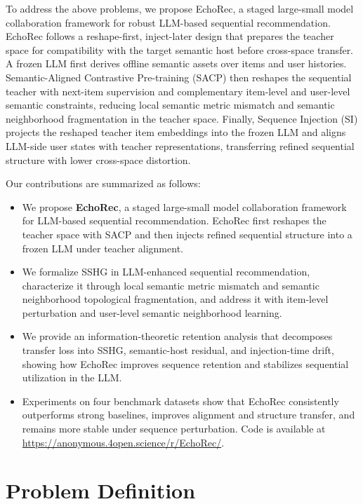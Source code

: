 ﻿\documentclass{article}
\begin{document}
To address the above problems, we propose EchoRec, a staged large-small model collaboration framework for robust LLM-based sequential recommendation. EchoRec follows a reshape-first, inject-later design that prepares the teacher space for compatibility with the target semantic host before cross-space transfer. A frozen LLM first derives offline semantic assets over items and user histories. Semantic-Aligned Contrastive Pre-training (SACP) then reshapes the sequential teacher with next-item supervision and complementary item-level and user-level semantic constraints, reducing local semantic metric mismatch and semantic neighborhood fragmentation in the teacher space. Finally, Sequence Injection (SI) projects the reshaped teacher item embeddings into the frozen LLM and aligns LLM-side user states with teacher representations, transferring refined sequential structure with lower cross-space distortion.

Our contributions are summarized as follows:
\begin{itemize}[leftmargin=1.5em]
\item We propose \textbf{EchoRec}, a staged large-small model collaboration framework for LLM-based sequential recommendation. EchoRec first reshapes the teacher space with SACP and then injects refined sequential structure into a frozen LLM under teacher alignment.
\item We formalize SSHG in LLM-enhanced sequential recommendation, characterize it through local semantic metric mismatch and semantic neighborhood topological fragmentation, and address it with item-level perturbation and user-level semantic neighborhood learning.
\item We provide an information-theoretic retention analysis that decomposes transfer loss into SSHG, semantic-host residual, and injection-time drift, showing how EchoRec improves sequence retention and stabilizes sequential utilization in the LLM.
\item Experiments on four benchmark datasets show that EchoRec consistently outperforms strong baselines, improves alignment and structure transfer, and remains more stable under sequence perturbation. Code is available at \url{https://anonymous.4open.science/r/EchoRec/}.
\end{itemize}

\section{Problem Definition}
\label{sec:preliminary}
\end{document}
